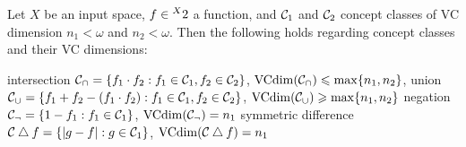 \begin{theorem}
\label{thm:VCbasic2}
Let $X$ be an input space, $f\in\prescript{X}{}{2}$ a function, and $\mathcal{C}_1$ and $\mathcal{C}_2$ concept classes of VC dimension $n_1<\omega$ and $n_2<\omega$. Then the following holds regarding concept classes and their VC dimensions:
\begin{outline}
    \1[(1)] intersection $\mathcal{C}_\cap = \{ f_1 \cdot f_2 : f_1 \in \mathcal{C}_1, f_2 \in \mathcal{C}_2\}$, $\operatorname{VCdim}(\mathcal{C}_\cap) \leqslant \max \{n_1,n_2\}$,
    \1[(2)] union $\mathcal{C}_\cup= \{f_1+f_2 - (f_1\cdot f_2) : f_1 \in \mathcal{C}_1, f_2 \in \mathcal{C}_2\}$, $\operatorname{VCdim}(\mathcal{C}_\cup) \geqslant \max \{n_1,n_2\}$
    \1[(3)] negation $\mathcal{C}_\lnot= \{1-f_1 : f_1\in\mathcal{C}_1\}$, $\operatorname{VCdim}(\mathcal{C}_\lnot) =n_1$
    \1[(4)] symmetric difference $\mathcal{C}\bigtriangleup f= \{|g-f| : g\in\mathcal{C}_1\}$, $\operatorname{VCdim}(\mathcal{C}\bigtriangleup f) = n_1$
\end{outline}
\end{theorem}
